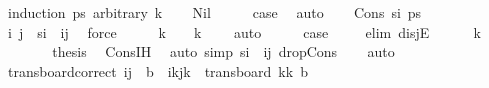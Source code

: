 \begin{isabellebody}
%
\isadelimproof
%
\endisadelimproof
%
\isatagproof
{}\isamarkupfalse%
\ {\isacharparenleft}{\kern0pt}induction\ ps\ arbitrary{\isacharcolon}{\kern0pt}\ k{\isacharparenright}{\kern0pt}\isanewline
\ \ \isamarkupfalse%
\ Nil\isanewline
\ \ \isamarkupfalse%
\ \isamarkupfalse%
\ {\isacharquery}{\kern0pt}case\ \isamarkupfalse%
\ auto\isanewline
{}\isamarkupfalse%
\isanewline
\ \ \isamarkupfalse%
\ {\isacharparenleft}{\kern0pt}Cons\ s\isactrlsub i\ ps{\isacharparenright}{\kern0pt}\isanewline
\ \ \isamarkupfalse%
\ \isamarkupfalse%
\ i\ j\ \ {\isachardoublequoteopen}s\isactrlsub i\ {\isacharequal}{\kern0pt}\ {\isacharparenleft}{\kern0pt}i{\isacharcomma}{\kern0pt}j{\isacharparenright}{\kern0pt}{\isachardoublequoteclose}\ \isamarkupfalse%
\ force\isanewline
\ \ \isamarkupfalse%
\ \isamarkupfalse%
\ {\isachardoublequoteopen}k\ {\isacharequal}{\kern0pt}\ {}\ {\isasymor}\ k\ {\isachargreater}{\kern0pt}\ {}{\isachardoublequoteclose}\ \isamarkupfalse%
\ auto\isanewline
\ \ \isamarkupfalse%
\ \isamarkupfalse%
\ {\isacharquery}{\kern0pt}case\ \isanewline
\ \ \isamarkupfalse%
\ {\isacharparenleft}{\kern0pt}elim\ disjE{\isacharparenright}{\kern0pt}\isanewline
\ \ \ \ \isamarkupfalse%
\ {\isachardoublequoteopen}k\ {\isachargreater}{\kern0pt}\ {}{\isachardoublequoteclose}\isanewline
\ \ \ \ \isamarkupfalse%
\ \isamarkupfalse%
\ {\isacharquery}{\kern0pt}thesis\ \isamarkupfalse%
\ Cons{\isachardot}{\kern0pt}IH\ \isamarkupfalse%
\ {\isacharparenleft}{\kern0pt}auto\ simp{\isacharcolon}{\kern0pt}\ {\isacartoucheopen}s\isactrlsub i\ {\isacharequal}{\kern0pt}\ {\isacharparenleft}{\kern0pt}i{\isacharcomma}{\kern0pt}j{\isacharparenright}{\kern0pt}{\isacartoucheclose}\ drop{\isacharunderscore}{\kern0pt}Cons{\isacharprime}{\kern0pt}{\isacharparenright}{\kern0pt}\isanewline
\ \ \isamarkupfalse%
\ auto\isanewline
{}\isamarkupfalse%
%
\endisatagproof
{\isafoldproof}%
%
\isadelimproof
\isanewline
%
\endisadelimproof
\isanewline
{}\isamarkupfalse%
\ trans{\isacharunderscore}{\kern0pt}board{\isacharunderscore}{\kern0pt}correct{\isacharcolon}{\kern0pt}\ {\isachardoublequoteopen}{\isacharparenleft}{\kern0pt}i{\isacharcomma}{\kern0pt}j{\isacharparenright}{\kern0pt}\ {\isasymin}\ b\ {\isasymlongleftrightarrow}\ {\isacharparenleft}{\kern0pt}i{\isacharplus}{\kern0pt}kj{\isacharplus}{\kern0pt}k\ {\isasymin}\ trans{\isacharunderscore}{\kern0pt}board\ {\isacharparenleft}{\kern0pt}kk\ b{\isachardoublequoteclose}\isanewline

\end{isabellebody}
